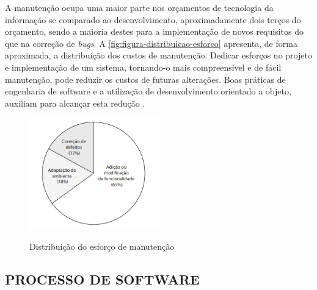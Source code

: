 A manutenção ocupa uma maior parte nos orçamentos de tecnologia da informação se comparado ao desenvolvimento, aproximadamente dois terços do orçamento, sendo a maioria destes para a implementação de novos requisitos do que na correção de \textit{bugs}. A \autoref{fig:figura-distribuicao-esforco} apresenta, de forma aproximada, a distribuição dos custos de manutenção. Dedicar esforços no projeto e implementação de um sistema, tornando-o mais compreensível e de fácil manutenção, pode reduzir os custos de futuras alterações. Boas práticas de engenharia de software e a utilização de desenvolvimento orientado a objeto, auxiliam para alcançar esta redução \cite{iansommerville}.
\begin{figure}[!htb]
    \centering
    \caption{Distribuição do esforço de manutenção}
    \includegraphics[width=0.5\textwidth]{./dados/figuras/distribuicao_do_esforco_de_manutencao}
    \label{fig:figura-distribuicao-esforco}
\end{figure}



\subsection{PROCESSO DE SOFTWARE}
\label{subsec:processoDeSoftware}
